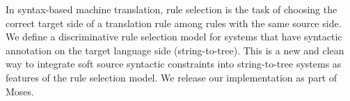 In syntax-based machine translation, rule selection is the task of choosing the correct target side of a translation rule among rules with the same source side. We define a discriminative rule selection model for systems that have syntactic annotation on the target language side (string-to-tree). This is a new and clean way to integrate soft source syntactic constraints into string-to-tree systems as features of the rule selection model. We release our implementation as part of Moses.
